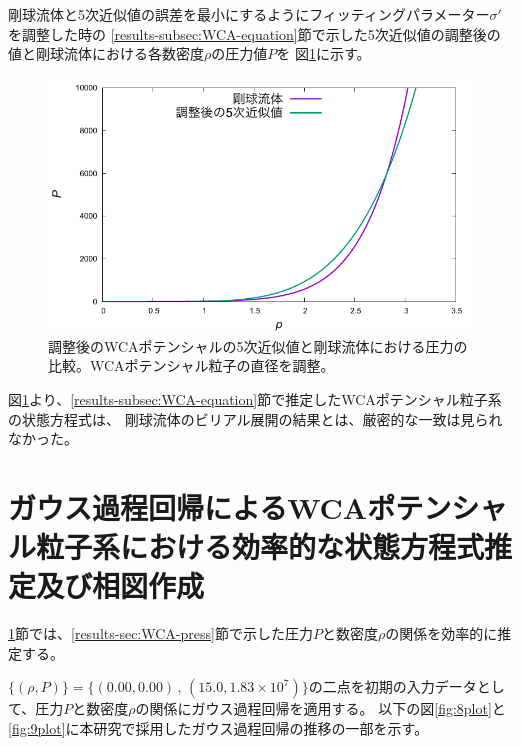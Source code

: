 \documentclass[titlepage]{jsreport}
\begin{document}
{{{剛球流体と5次近似値の誤差を最小にするようにフィッティングパラメーター${\sigma}'$を調整した時の
\ref{results-subsec:WCA-equation}節で示した5次近似値の調整後の値と剛球流体における各数密度$\rho$の圧力値$P$を
図\ref{fig:fit_compare_previous-research}に示す。

\begin{figure}[htbp]
    \begin{center}
        \includegraphics[width=14cm]{fig/fit_compare_previous-research.pdf}
    \end{center}
    \caption{調整後のWCAポテンシャルの5次近似値と剛球流体における圧力の比較。WCAポテンシャル粒子の直径を調整。}
    \label{fig:fit_compare_previous-research}
\end{figure}

\newpage
図\ref{fig:fit_compare_previous-research}より、\ref{results-subsec:WCA-equation}節で推定したWCAポテンシャル粒子系の状態方程式は、
剛球流体のビリアル展開の結果とは、厳密的な一致は見られなかった。


\section{ガウス過程回帰によるWCAポテンシャル粒子系における効率的な状態方程式推定及び相図作成}\label{results-sec:Gauss}
\ref{results-sec:Gauss}節では、\ref{results-sec:WCA-press}節で示した圧力$P$と数密度$\rho$の関係を効率的に推定する。

$\{(\rho,P)\}=\{(0.00,0.00)\,,\,(15.0,1.83×10^7)\}$の二点を初期の入力データとして、圧力$P$と数密度$\rho$の関係にガウス過程回帰を適用する。
以下の図\ref{fig:8plot}と\ref{fig:9plot}に本研究で採用したガウス過程回帰の推移の一部を示す。


}}}
\end{document}
